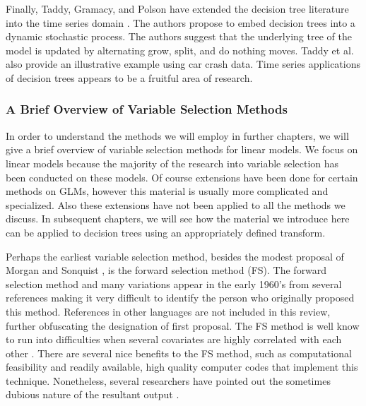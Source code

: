 Finally, Taddy, Gramacy, and Polson have extended the decision tree literature into the time series domain \cite{taddy2011dynamic}. The authors propose to embed decision trees into a dynamic stochastic process. The authors suggest that the underlying tree of the model is updated by alternating grow, split, and do nothing moves. Taddy et al. also provide an illustrative example using car crash data. Time series applications of decision trees appears to be a fruitful area of research. 

\subsubsection{A Brief Overview of Variable Selection Methods}

In order to understand the methods we will employ in further chapters, we will give a brief overview of variable selection methods for linear models. We focus on linear models because the majority of the research into variable selection has been conducted on these models. Of course extensions have been done for certain methods on GLMs, however this material is usually more complicated and specialized. Also these extensions have not been applied to all the methods we discuss. In subsequent chapters, we will see how the material we introduce here can be applied to decision trees using an appropriately defined transform. 

Perhaps the earliest variable selection method, besides the modest proposal of Morgan and Sonquist \cite{morgan1963problems}, is the forward selection method (FS). The forward selection method and many variations appear in the early 1960's from several references making it very difficult to identify the person who originally proposed this method. References in other languages are not included in this review, further obfuscating the designation of first proposal. The FS method is well know to run into difficulties when several covariates  are highly correlated with each other \cite{miller1984selection}. There are several nice benefits to the FS method, such as computational feasibility and readily available, high quality computer codes that implement this technique. Nonetheless, several researchers have pointed out the sometimes dubious nature of the resultant output \cite{halvorson1960regression}. 

